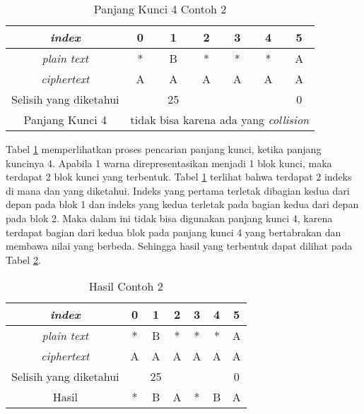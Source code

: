 	\begin{table}[H]
	 	\centering
	 	\caption{Panjang Kunci 4 Contoh 2}
	 	\setlength{\arrayrulewidth}{.08em}
	 	\begin{tabular}{|c|c|c|c|c|c|c|}\hline
		\textit{index}&0&1&2&3&4&5\\ \hline
	 	\textit{plain text}&\cellcolor{blue!15}*&\cellcolor{blue!15}B&\cellcolor{blue!15}*&\cellcolor{blue!15}*&\cellcolor{green!15}*&\cellcolor{green!15}A\\ \hline
	 	\textit{ciphertext}&\cellcolor{blue!15}A&\cellcolor{blue!15}A&\cellcolor{blue!15}A&\cellcolor{blue!15}A&\cellcolor{green!15}A&\cellcolor{green!15}A\\ \hline
	 	Selisih yang diketahui& &25& & & &0\\ \hline
	 	Panjang Kunci 4 & \multicolumn{6}{c|}{tidak bisa karena ada yang \textit{collision}}\\ \hline
	 	\end{tabular}
	 	\label{tab:k4contoh2}
	\end{table}	
	Tabel \ref{tab:k4contoh2} memperlihatkan proses pencarian panjang kunci, ketika panjang kuncinya 4. Apabila 1 warna direpresentasikan menjadi 1 blok kunci, maka terdapat 2 blok kunci yang terbentuk. Tabel \ref{tab:k4contoh2} terlihat bahwa terdapat 2 indeks di mana \plaintext dan \ciphertext yang diketahui. Indeks yang pertama terletak dibagian kedua dari depan pada blok 1 dan indeks yang kedua terletak pada bagian kedua dari depan pada blok 2. Maka dalam ini tidak bisa digunakan panjang kunci 4, karena terdapat bagian dari kedua blok pada panjang kunci 4 yang bertabrakan dan membawa nilai yang berbeda. Sehingga hasil yang terbentuk dapat dilihat pada Tabel \ref{tab:rescontoh2}.
	
	\begin{table}[H]
	 	\centering
	 	\caption{Hasil Contoh 2}
	 	\setlength{\arrayrulewidth}{.08em}
	 	\begin{tabular}{|c|c|c|c|c|c|c|}\hline
		\textit{index}&0&1&2&3&4&5\\ \hline
	 	\textit{plain text}&*&B&*&*&*&A\\ \hline
	 	\textit{ciphertext}&A&A&A&A&A&A\\ \hline
	 	Selisih yang diketahui& &25& & & &0\\ \hline
	 	Hasil &*&B&A&*&B&A \\ \hline
	 	\end{tabular}
	 	\label{tab:rescontoh2}
	\end{table}	 
	
